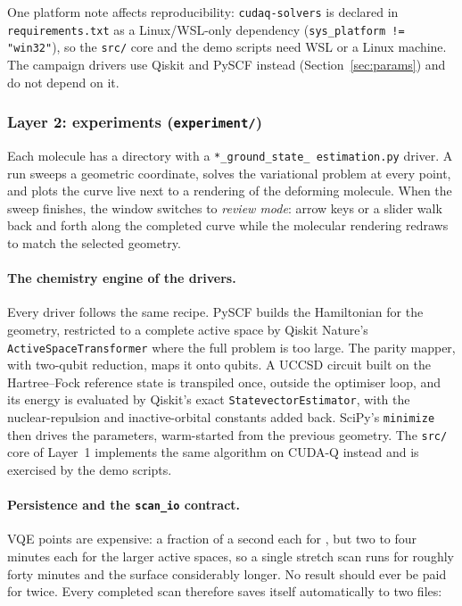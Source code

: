 \documentclass[sigconf,screen,nonacm]{acmart}
\begin{document}
One platform note affects reproducibility: \texttt{cudaq-solvers} is
declared in \texttt{requirements.txt} as a Linux/WSL-only dependency
(\texttt{sys\_platform != "win32"}), so the \texttt{src/} core and the demo
scripts need WSL or a Linux machine. The campaign drivers use Qiskit and PySCF
instead (Section~\ref{sec:params}) and do not depend on it.

\subsubsection{Layer 2: experiments (\texttt{experiment/})}

Each molecule has a directory with a \texttt{*\_ground\_state\_%
estimation.py} driver. A run sweeps a geometric coordinate, solves the
variational problem at every point, and plots the curve live next to a
rendering of the deforming molecule. When the sweep finishes, the window
switches to \emph{review mode}: arrow keys or a slider walk back and forth
along the completed curve while the molecular rendering redraws to match the
selected geometry.

\paragraph{The chemistry engine of the drivers.}
Every driver follows the same recipe. PySCF builds the Hamiltonian for the
geometry, restricted to a complete active space by Qiskit Nature's
\texttt{ActiveSpaceTransformer} where the full problem is too large. The parity
mapper, with two-qubit reduction, maps it onto qubits. A UCCSD circuit built on
the Hartree--Fock reference state is transpiled once, outside the optimiser
loop, and its energy is evaluated by Qiskit's exact
\texttt{StatevectorEstimator}, with the nuclear-repulsion and inactive-orbital
constants added back. SciPy's \texttt{minimize} then drives the parameters,
warm-started from the previous geometry. The \texttt{src/} core of
Layer~1 implements the same algorithm on CUDA-Q instead and is exercised by the
demo scripts.

\paragraph{Persistence and the \texttt{scan\_io} contract.}
VQE points are expensive: a fraction of a second each for , but two to
four minutes each for the larger active spaces, so a single  stretch
scan runs for roughly forty minutes and the  surface considerably
longer. No result should ever be paid for twice. Every completed scan
therefore saves itself automatically to two files:
\end{document}

